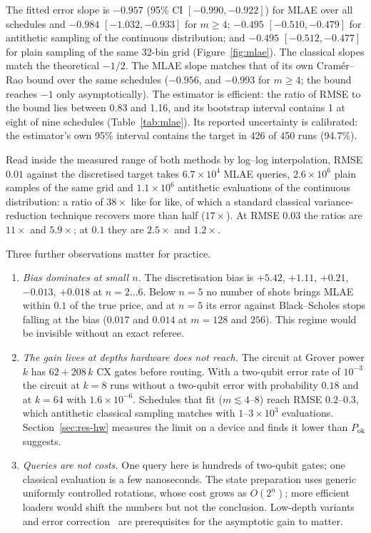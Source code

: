 \documentclass[11pt,a4paper]{article}
\begin{document}
The fitted error slope is $-0.957$ (95\% CI $[-0.990, -0.922]$) for MLAE over
all schedules and $-0.984$ $[-1.032, -0.933]$ for $m \ge 4$; $-0.495$
$[-0.510, -0.479]$ for antithetic sampling of the continuous distribution;
and $-0.495$ $[-0.512, -0.477]$ for plain sampling of the same 32-bin grid
(Figure~\ref{fig:mlae}). The classical slopes match the theoretical $-1/2$.
The MLAE slope matches that of its own Cram\'er--Rao bound over the same
schedules ($-0.956$, and $-0.993$ for $m \ge 4$; the bound reaches $-1$ only
asymptotically). The estimator is
efficient: the ratio of RMSE to the bound lies between 0.83 and 1.16, and
its bootstrap interval contains 1 at eight of nine schedules
(Table~\ref{tab:mlae}). Its reported uncertainty is calibrated: the
estimator's own 95\% interval contains the target in 426 of 450 runs
(94.7\%).

Read inside the measured range of both methods by log--log interpolation,
RMSE $0.01$ against the discretised target takes $6.7\times10^{4}$ MLAE
queries, $2.6\times10^{6}$ plain samples of the same grid and
$1.1\times10^{6}$ antithetic evaluations of the continuous distribution: a
ratio of $38\times$ like for like, of which a standard classical
variance-reduction technique recovers more than half ($17\times$). At RMSE
$0.03$ the ratios are $11\times$ and $5.9\times$; at $0.1$ they are
$2.5\times$ and $1.2\times$.

Three further observations matter for practice.
\begin{enumerate}
  \item \emph{Bias dominates at small $n$.} The discretisation bias is
        $+5.42$, $+1.11$, $+0.21$, $-0.013$, $+0.018$ at $n = 2\dots6$. Below
        $n = 5$ no number of shots brings MLAE within $0.1$ of the true price,
        and at $n = 5$ its error against Black--Scholes stops falling at the
        bias ($0.017$ and $0.014$ at $m = 128$ and $256$). This regime would
        be invisible without an exact referee.
  \item \emph{The gain lives at depths hardware does not reach.} The circuit
        at Grover power $k$ has $62 + 208\,k$ CX gates before routing. With a
        two-qubit error rate of $10^{-3}$ the circuit at $k = 8$ runs without
        a two-qubit error with probability $0.18$ and at $k = 64$ with
        $1.6\times10^{-6}$. Schedules that fit ($m \lesssim 4$--$8$) reach
        RMSE $0.2$--$0.3$, which antithetic classical sampling matches with
        $1$--$3\times10^{3}$ evaluations. Section~\ref{sec:res-hw} measures the
        limit on a device and finds it lower than $P_{\mathrm{ok}}$ suggests.
  \item \emph{Queries are not costs.} One query here is hundreds of
        two-qubit gates; one classical evaluation is a few nanoseconds. The
        state preparation uses generic uniformly controlled rotations, whose
        cost grows as $O(2^n)$; more efficient loaders would shift the numbers
        but not the conclusion. Low-depth variants~\cite{giurgica2022} and
        error correction~\cite{beverland2022} are prerequisites for the
        asymptotic gain to matter.
\end{enumerate}
\end{document}
